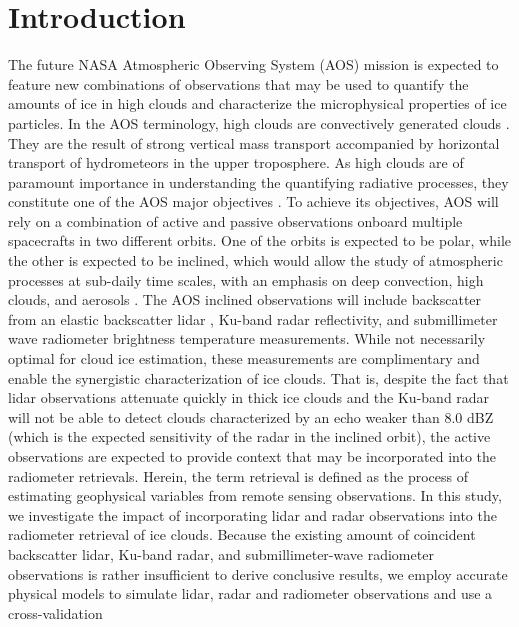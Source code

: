 \documentclass{ametsocV6.1}
\begin{document}
\section{Introduction}
The future NASA Atmospheric Observing System (AOS) mission \citep{braun2022} is expected to feature new 
combinations of observations that may be used to quantify the amounts of ice in high clouds and 
characterize the microphysical properties of ice particles. In the AOS terminology, high clouds are convectively
generated clouds \citep{braun2022}. They are the result of strong vertical mass transport accompanied by
horizontal transport of hydrometeors in the upper troposphere.  As high clouds are of paramount importance in
understanding the quantifying radiative processes, they constitute one of the AOS major objectives \citep{braun2022}.
To achieve its objectives, AOS will rely on a combination of active and passive observations onboard multiple spacecrafts
in two different orbits.  One of the orbits is expected to be polar, while the other is expected to be inclined, which
would allow the study of atmospheric processes at sub-daily time scales, with an emphasis on deep
convection, high clouds, and aerosols \citep{braun2022,yorks2022}.
The AOS inclined observations will include backscatter
from an elastic backscatter lidar \citep{weitkamp2006},
Ku-band radar reflectivity, and submillimeter wave radiometer brightness temperature measurements. 
While not necessarily optimal for cloud ice estimation, these measurements are 
complimentary and enable the synergistic characterization of ice clouds. 
That is, despite the fact that lidar observations 
attenuate quickly in thick ice clouds and the Ku-band radar will not be able to detect clouds 
characterized by an echo weaker than 8.0 dBZ (which is the expected sensitivity of the radar in the inclined
orbit), the active observations are expected to provide context 
that may be incorporated into the radiometer retrievals. Herein, the term retrieval is defined as the 
process of estimating geophysical variables from remote sensing observations.
In this study, we investigate the impact of 
incorporating lidar and radar observations into the radiometer retrieval of ice clouds.
Because the existing amount of coincident backscatter lidar, Ku-band radar, and submillimeter-wave 
radiometer observations is rather insufficient to derive conclusive results, we employ accurate 
physical models to simulate lidar, radar and radiometer observations and use a cross-validation 
\end{document}
